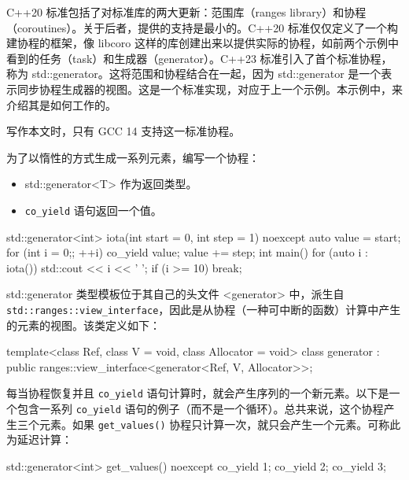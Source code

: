 

C++20 标准包括了对标准库的两大更新：范围库（ranges library）和协程（coroutines）。关于后者，提供的支持是最小的。C++20 标准仅仅定义了一个构建协程的框架，像 libcoro 这样的库创建出来以提供实际的协程，如前两个示例中看到的任务（task）和生成器（generator）。C++23 标准引入了首个标准协程，称为 std::generator。这将范围和协程结合在一起，因为 std::generator 是一个表示同步协程生成器的视图。这是一个标准实现，对应于上一个示例。本示例中，来介绍其是如何工作的。

\begin{myNotic}
写作本文时，只有 GCC 14 支持这一标准协程。
\end{myNotic}


为了以惰性的方式生成一系列元素，编写一个协程：

\begin{itemize}
\item
std::generator<T> 作为返回类型。

\item
\verb|co_yield| 语句返回一个值。
\end{itemize}

\begin{cpp}
std::generator<int> iota(int start = 0, int step = 1) noexcept
{
    auto value = start;
    for (int i = 0;; ++i)
    {
        co_yield value;
        value += step;
    }
}
int main()
{
    for (auto i : iota())
    {
        std::cout << i << ' ';
        if (i >= 10) break;
    }
}
\end{cpp}


std::generator 类型模板位于其自己的头文件 <generator> 中，派生自 \verb|std::ranges::view_interface|，因此是从协程（一种可中断的函数）计算中产生的元素的视图。该类定义如下：

\begin{cpp}
template<class Ref, class V = void, class Allocator = void>
class generator
    : public ranges::view_interface<generator<Ref, V, Allocator>>;
\end{cpp}

每当协程恢复并且 \verb|co_yield| 语句计算时，就会产生序列的一个新元素。以下是一个包含一系列 \verb|co_yield| 语句的例子（而不是一个循环）。总共来说，这个协程产生三个元素。如果 \verb|get_values()| 协程只计算一次，就只会产生一个元素。可称此为延迟计算：

\begin{cpp}
std::generator<int> get_values() noexcept
{
    co_yield 1;
    co_yield 2;
    co_yield 3;
}
\end{cpp}

